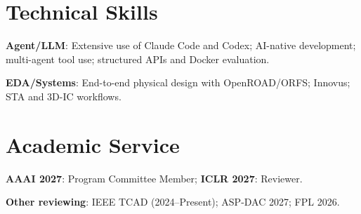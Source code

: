 \documentclass[11pt,a4paper]{article}
\begin{document}
\section*{Technical Skills}
{\small
\textbf{Agent/LLM}: Extensive use of Claude Code and Codex; AI-native development; multi-agent tool use; structured APIs and Docker evaluation.\par
\vspace{2pt}
\textbf{EDA/Systems}: End-to-end physical design with OpenROAD/ORFS; Innovus; STA and 3D-IC workflows.\par
}

\section*{Academic Service}
{\small
\textbf{AAAI 2027}: Program Committee Member; \textbf{ICLR 2027}: Reviewer.\par
\textbf{Other reviewing}: IEEE TCAD (2024--Present); ASP-DAC 2027; FPL 2026.\par
}
\end{document}
